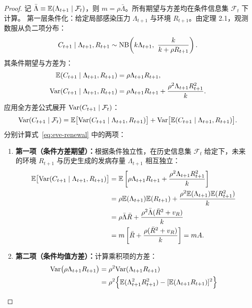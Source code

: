 \begin{proof}
记 $\bar{\Lambda} \equiv \mathbb{E}(\Lambda_{t+1} \mid \mathcal{F}_t)$，则 $m = \rho \bar{\Lambda}$。所有期望与方差均在条件信息集 $\mathcal{F}_t$ 下计算。
第一层条件化：给定局部感染压力 $\Lambda_{t+1}$ 与环境 $R_{t+1}$。由定理 2.1，观测数服从负二项分布：
\begin{equation}
  C_{t+1} \mid \Lambda_{t+1}, R_{t+1} \sim \mathrm{NB}\!\left( k \Lambda_{t+1},\ \frac{k}{k + \rho R_{t+1}} \right).
\end{equation}
其条件期望与方差为：
\begin{align}
  \mathbb{E}(C_{t+1} \mid \Lambda_{t+1}, R_{t+1}) &= \rho \Lambda_{t+1} R_{t+1}, \\
  \mathrm{Var}(C_{t+1} \mid \Lambda_{t+1}, R_{t+1}) &= \rho \Lambda_{t+1} R_{t+1} + \frac{\rho^2 \Lambda_{t+1} R_{t+1}^2}{k}.
\end{align}
应用全方差公式展开 $\mathrm{Var}(C_{t+1} \mid \mathcal{F}_t)$：
\begin{equation}
  \mathrm{Var}(C_{t+1} \mid \mathcal{F}_t) = \mathbb{E}\big[ \mathrm{Var}(C_{t+1} \mid \Lambda_{t+1}, R_{t+1}) \big] + \mathrm{Var}\big[ \mathbb{E}(C_{t+1} \mid \Lambda_{t+1}, R_{t+1}) \big].
  \label{eq:eve-renewal}
\end{equation}
分别计算式~\eqref{eq:eve-renewal} 中的两项：
\begin{enumerate}
  \item \textbf{第一项（条件方差期望）：}根据条件独立性，在历史信息集 $\mathcal{F}_t$ 给定下，未来的环境 $R_{t+1}$ 与历史生成的发病存量 $\Lambda_{t+1}$ 相互独立：
  \begin{align}
    \mathbb{E}\big[ \mathrm{Var}(C_{t+1} \mid \Lambda_{t+1}, R_{t+1}) \big] &= \mathbb{E}\left[ \rho \Lambda_{t+1} R_{t+1} + \frac{\rho^2 \Lambda_{t+1} R_{t+1}^2}{k} \right] \nonumber \\
    &= \rho \mathbb{E}(\Lambda_{t+1}) \mathbb{E}(R_{t+1}) + \frac{\rho^2 \mathbb{E}(\Lambda_{t+1}) \mathbb{E}(R_{t+1}^2)}{k} \nonumber \\
    &= \rho \bar{\Lambda} \bar{R} + \frac{\rho^2 \bar{\Lambda}(\bar{R}^2 + v_R)}{k} \nonumber \\
    &= m \left[ \bar{R} + \frac{\rho(\bar{R}^2 + v_R)}{k} \right] = m A.
  \end{align}
  \item \textbf{第二项（条件均值方差）：}计算乘积项的方差：
  \begin{align}
    \Var\big( \rho \Lambda_{t+1} R_{t+1} \big) &= \rho^2 \Var(\Lambda_{t+1} R_{t+1}) \nonumber \\
    &= \rho^2 \Big\{ \E(\Lambda_{t+1}^2 R_{t+1}^2) - [\E(\Lambda_{t+1} R_{t+1})]^2 \Big\} \nonumber \\

\end{align}
\end{enumerate}
\end{proof}
